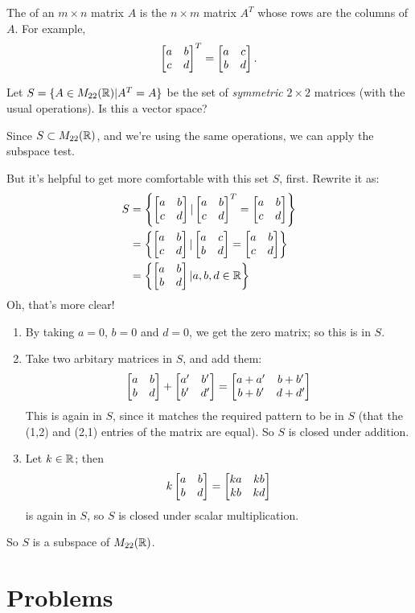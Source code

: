 \begin{definition}\label{transpose}
The  of an $m\times n$ matrix $A$ is the $n \times m$ matrix $A^T$
whose rows are the columns of $A$.  For example,
$$
\left[ \begin{matrix} a&b\\c&d \end{matrix} \right]^T = \left[ \begin{matrix} a&c\\b&d \end{matrix} \right].
$$
\end{definition}

\begin{myprob} Let $S = \{ A \in M_{22}(\mathbb{R}) | A^T = A\}$ be the set of \emph{symmetric} $2 \times 2$ matrices (with the usual operations).  Is this a vector space?

\begin{mysol} Since $S \subset M_{22}(\mathbb{R})$, and we're using the same operations,
we can apply the subspace test.

But it's helpful to get more comfortable with this set $S$, first.
Rewrite it as:
\begin{align*}
S &= \left\{ \left[ \begin{matrix} a&b\\c&d \end{matrix} \right] |  \left[ \begin{matrix} a&b\\c&d \end{matrix} \right]^T = \left[ \begin{matrix} a&b\\c&d \end{matrix} \right]\right\}\\
&= \left\{ \left[ \begin{matrix} a&b\\c&d \end{matrix} \right] |  \left[ \begin{matrix} a&c\\b&d \end{matrix} \right] = \left[ \begin{matrix} a&b\\c&d \end{matrix} \right]\right\}\\
&= \left\{ \left[ \begin{matrix} a&b\\b&d \end{matrix} \right] | a,b,d \in \mathbb{R}\right\}
\end{align*}
Oh, that's more clear!

\begin{enumerate}
\item By taking $a=0$, $b=0$ and $d=0$, we get the zero matrix; so this
is in $S$.
\item Take two arbitary matrices in $S$, and add them:
$$
\left[ \begin{matrix} a&b\\b&d \end{matrix} \right] + \left[ \begin{matrix} a'&b' \\ b'&d' \end{matrix} \right] = \left[ \begin{matrix} a+a' & b+b' \\ b+b' & d+d' \end{matrix} \right]
$$
This is again in $S$, since it matches the required pattern to be
in $S$ (that the (1,2) and (2,1) entries of the matrix are equal).
So $S$ is closed under addition.
\item Let $k\in \mathbb{R}$; then
$$
k\left[ \begin{matrix} a&b\\b&d \end{matrix} \right] = \left[ \begin{matrix} ka & kb \\ kb& kd \end{matrix} \right]
$$
is again in $S$, so $S$ is closed under scalar multiplication.
\end{enumerate}
So $S$ is a subspace of $M_{22}(\mathbb{R})$.
\end{mysol}\end{myprob}




\section*{Problems}
%


